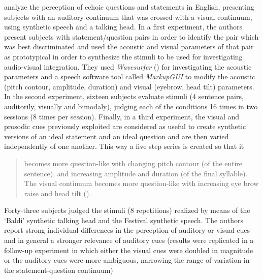 \documentclass[output=paper]{langsci/langscibook}
\begin{document}
\citet{Srinivasan2003} analyze the perception of echoic questions and statements in English, presenting subjects with an auditory continuum that was crossed with a visual continuum, using synthetic speech and a talking head. In a first experiment, the authors present subjects with statement\slash question pairs in order to identify the pair which was best discriminated and used the acoustic and visual parameters of that pair as prototypical in order to synthesize the stimuli to be used for investigating audio-visual integration. They used \textit{Wavesurfer} (\citealt{Sjolander.1999}) for investigating the acoustic parameters and a speech software tool called \textit{MarkupGUI} \citep{Wouters1999} to modify the acoustic (pitch contour, amplitude, duration) and visual (eyebrow, head tilt) parameters. In the second experiment, sixteen subjects evaluate stimuli (4 sentence pairs, auditorily, visually and bimodaly), judging each of the conditions 16 times in two sessions (8 times per session). Finally, in a third experiment, the visual and prosodic cues previously exploited are considered as useful to create synthetic versions of an ideal statement and an ideal question and are then varied independently of one another. This way a five step series is created so that it

\begin{quote}
becomes more question-like with changing pitch contour (of the entire sentence), and increasing amplitude and duration (of the final syllable). The visual continuum becomes more question-like with increasing eye brow raise and head tilt (\citealt[9]{Srinivasan2003}).
\end{quote}

Forty-three subjects judged the stimuli (8 repetitions) realized by means of the ‘Baldi’ synthetic talking head and the Festival synthetic speech. The authors report strong individual differences in the perception of auditory or visual cues and in general a stronger relevance of auditory cues (results were replicated in a follow-up experiment in which either the visual cues were doubled in magnitude or the auditory cues were more ambiguous, narrowing the range of variation in the statement-question continuum)
\end{document}

